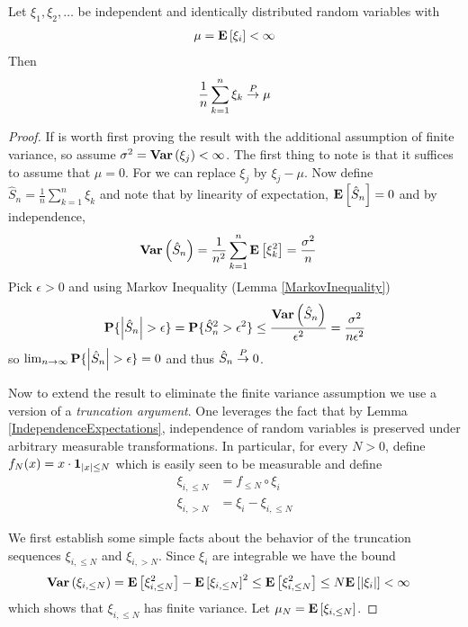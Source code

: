 \begin{thm}\label{WLLN} Let $\xi_1, \xi_2, \dots$ be independent and identically
  distributed random variables with
\begin{align*}
\mu = \textbf{E}\left[\xi_i\right] < \infty
\end{align*}
Then 
\begin{align*}
\frac{1}{n} \sum_{k=1}^n \xi_k \overset{P}\to \mu
\end{align*}
\end{thm}
\begin{proof}
If is worth first proving the result with the additional assumption of
finite variance, so assume $\sigma^2 = \textbf{Var} \left (\xi_j \right ) < \infty$.
The first thing to note is that it suffices to assume that $\mu =0$.
For we can replace $\xi_j$ by $\xi_j - \mu$.  Now define $\hat{S}_n = \frac{1}{n} \sum_{k=1}^n \xi_k$ and note that by
linearity of expectation, $\textbf{E}\left[\hat{S}_n\right] = 0$ and by
independence, 
\begin{align*}
\textbf{Var} \left (\hat{S}_n \right ) &= \frac{1}{n^2}  \sum_{k=1}^n
\textbf{E}\left[\xi_k^2\right] = \frac{\sigma^2}{n}
\end{align*}
Pick $\epsilon > 0$ and using Markov
  Inequality (Lemma
  \ref{MarkovInequality})
\begin{align*}
\textbf{P}\{\left \vert \hat{S}_n \right \vert > \epsilon\} = \textbf{P}\{\hat{S}_n^2 >
  \epsilon^2\} \leq \frac{\textbf{Var} \left (\hat{S}_n \right )}{\epsilon^2} = \frac{\sigma^2}{n \epsilon^2}
\end{align*}
so $\lim_{n \to \infty} \textbf{P}\{\left \vert \hat{S}_n \right \vert > \epsilon\}= 0$ and
thus $\hat{S}_n \overset{P}\to 0$.

Now to extend the result to eliminate the finite variance assumption
we use a version of a \emph{truncation argument}.  One leverages the
fact that by Lemma \ref{IndependenceExpectations}, independence of random variables is
preserved under arbitrary measurable transformations.  In particular,
for every $N > 0$, define $f_N(x) = x \cdot
\textbf{1}_{\left \vert x \right \vert\leq N}$
which is easily seen to be measurable and define 
\begin{align*}
\xi_{i,\leq N} &=
f_{\leq N} \circ \xi_i \\
\xi_{i, > N} &=  \xi_i - \xi_{i,\leq N}
\end{align*}

We first establish some simple facts about the behavior of the
truncation sequences $\xi_{i,\leq N}$ and $\xi_{i,> N}$.  Since
$\xi_i$ are integrable we have the bound 
\begin{align*}
\textbf{Var} \left (\xi_{i,\leq N} \right ) &= \textbf{E}\left[\xi^2_{i,\leq N}\right] -
\textbf{E}\left[\xi_{i,\leq N}\right]^2 \leq \textbf{E}\left[\xi^2_{i,\leq N}\right]
\leq N \textbf{E}\left[\left \vert \xi_i \right \vert\right] < \infty
\end{align*}
which shows that $\xi_{i,\leq N}$ has finite variance.  Let $\mu_N = \textbf{E}\left[\xi_{i,\leq N}\right]$.


\end{proof}
